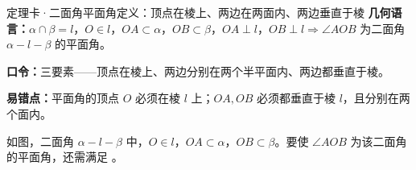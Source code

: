 \documentclass{exam-zh}
\begin{document}
\begin{eduDualExplain}
  \begin{eduExplainLeft}
  \end{eduExplainLeft}

  \begin{eduExplainRight}
  \end{eduExplainRight}
\end{eduDualExplain}





\begin{eduSolutionBox}{定理卡·二面角平面角定义：顶点在棱上、两边在两面内、两边垂直于棱}
  \begingroup
  \setlength{\parskip}{2.5mm}
\textbf{几何语言：}$\alpha\cap\beta=l$，$O\in l$，$OA\subset\alpha$，$OB\subset\beta$，$OA\perp l$，$OB\perp l\Rightarrow\angle AOB$ 为二面角 $\alpha\!-\!l\!-\!\beta$ 的平面角。\par
\textbf{口令：}三要素——顶点在棱上、两边分别在两个半平面内、两边都垂直于棱。\par
\textbf{易错点：}平面角的顶点 $O$ 必须在棱 $l$ 上；$OA,OB$ 必须都垂直于棱 $l$，且分别在两个面内。\par
  \endgroup
\end{eduSolutionBox}




\begin{eduProblemBlock}[例9·二面角平面角]
\noindent
\begin{minipage}[t]{\dimexpr\linewidth-70mm-6mm\relax}
\vspace{0pt}
如图，二面角 $\alpha\!-\!l\!-\!\beta$ 中，$O\in l$，$OA\subset\alpha$，$OB\subset\beta$。要使 $\angle AOB$ 为该二面角的平面角，还需满足 \underline{\hspace{24mm}}。

\end{minipage}\hfill
\begin{diagramcoltikz}{70mm}{二面角 α-l-β，O 在棱 l 上，OA、OB 分别在两个面内。}
}
\end{diagramcoltikz}
\end{eduProblemBlock}
\end{document}
